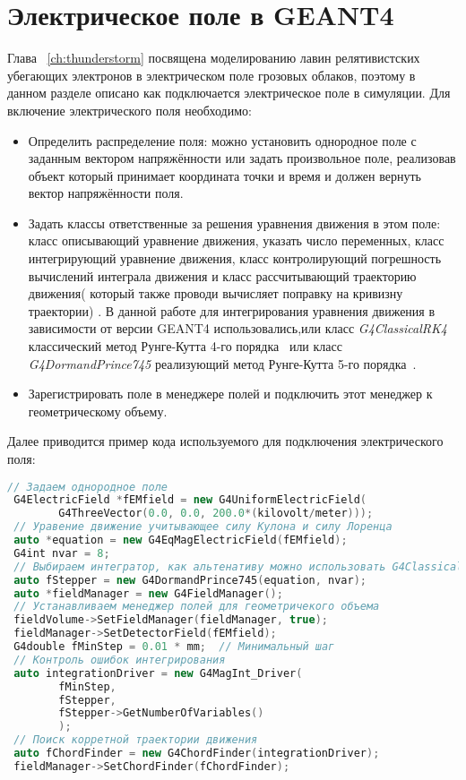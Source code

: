 \section{Электрическое поле в GEANT4 }\label{sec:theory/efield}
Глава ~\ref{ch:thunderstorm} посвящена моделированию лавин релятивистских убегающих электронов в электрическом поле грозовых облаков, поэтому в данном разделе описано как подключается электрическое поле в симуляции. Для включение электрического поля необходимо: 
\begin{itemize}
    \item Определить распределение поля: можно установить однородное поле с заданным вектором напряжённости или задать произвольное поле, реализовав объект который принимает координата точки и время и должен вернуть вектор напряжённости поля.
    \item Задать классы ответственные за решения уравнения движения в этом поле: класс описывающий уравнение движения, указать число переменных, класс интегрирующий уравнение движения, класс контролирующий погрешность вычислений интеграла движения и класс рассчитывающий траекторию движения( который также проводи вычисляет поправку на кривизну траектории) . В данной работе для интегрирования уравнения движения в зависимости от версии GEANT4 использовались,или класс \textit{G4ClassicalRK4} классический метод Рунге-Кутта 4-го порядка~\cite{fedorenko1994} или класс \textit{G4DormandPrince745} реализующий метод Рунге-Кутта 5-го порядка~\cite{dormand1980family}. 
    \item Зарегистрировать поле в менеджере полей и подключить этот менеджер к геометрическому объему.
\end{itemize}

Далее приводится пример кода используемого для подключения электрического поля:
\begin{lstlisting}[language=C++]
 // Задаем однородное поле
 G4ElectricField *fEMfield = new G4UniformElectricField(
        G4ThreeVector(0.0, 0.0, 200.0*(kilovolt/meter)));
 // Уравение движение учитывающее силу Кулона и силу Лоренца
 auto *equation = new G4EqMagElectricField(fEMfield);
 G4int nvar = 8;
 // Выбираем интегратор, как альтенативу можно использовать G4ClassicalRK4
 auto fStepper = new G4DormandPrince745(equation, nvar);
 auto *fieldManager = new G4FieldManager();
 // Устанавливаем менеджер полей для геометричекого объема
 fieldVolume->SetFieldManager(fieldManager, true); 
 fieldManager->SetDetectorField(fEMfield);
 G4double fMinStep = 0.01 * mm;  // Минимальный шаг
 // Контроль ошибок интегрирования
 auto integrationDriver = new G4MagInt_Driver(
        fMinStep,
        fStepper,
        fStepper->GetNumberOfVariables()
        );
 // Поиск корретной траектории движения
 auto fChordFinder = new G4ChordFinder(integrationDriver);
 fieldManager->SetChordFinder(fChordFinder);
\end{lstlisting}
